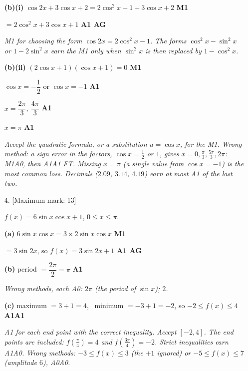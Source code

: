 \documentclass[12pt, twoside]{article}
\begin{document}
\begin{enumerate}[itemsep=0.1cm]
\textbf{(b)(i)} $\cos 2x + 3\cos x + 2 = 2\cos^{2}x - 1 + 3\cos x + 2$
\hfill \textbf{M1}

$= 2\cos^{2}x + 3\cos x + 1$ \hfill \textbf{A1 AG}

\emph{M1 for choosing the form $\cos 2x = 2\cos^{2}x - 1$. The forms
$\cos^{2}x - \sin^{2}x$ or $1 - 2\sin^{2}x$ earn the M1 only when
$\sin^{2}x$ is then replaced by $1 - \cos^{2}x$.}

\textbf{(b)(ii)} $(2\cos x + 1)(\cos x + 1) = 0$ \hfill \textbf{M1}

$\cos x = -\dfrac{1}{2}$ \quad or \quad $\cos x = -1$ \hfill \textbf{A1}

$x = \dfrac{2\pi}{3},\ \dfrac{4\pi}{3}$ \hfill \textbf{A1}

$x = \pi$ \hfill \textbf{A1}

\emph{Accept the quadratic formula, or a substitution $u = \cos x$, for
the M1. Wrong method: a sign error in the factors, $\cos x = \frac{1}{2}$
or $1$, gives $x = 0, \frac{\pi}{3}, \frac{5\pi}{3}, 2\pi$: M1A0, then
A1A1 FT. Missing $x = \pi$ (a single value from $\cos x = -1$) is the
most common loss. Decimals ($2.09$, $3.14$, $4.19$) earn at most A1 of the
last two.}

\newpage

\item[4.] [Maximum mark: 13]

$f(x) = 6\sin x\cos x + 1$, \quad $0 \le x \le \pi$.

\textbf{(a)} $6\sin x\cos x = 3 \times 2\sin x\cos x$ \hfill \textbf{M1}

$= 3\sin 2x$, so $f(x) = 3\sin 2x + 1$ \hfill \textbf{A1 AG}

\textbf{(b)} period $= \dfrac{2\pi}{2} = \pi$ \hfill \textbf{A1}

\emph{Wrong methods, each A0: $2\pi$ (the period of $\sin x$); $2$.}

\textbf{(c)} maximum $= 3 + 1 = 4$, \ minimum $= -3 + 1 = -2$, so
$-2 \le f(x) \le 4$ \hfill \textbf{A1A1}

\emph{A1 for each end point with the correct inequality. Accept $[-2, 4]$.
The end points are included: $f\left(\frac{\pi}{4}\right) = 4$ and
$f\left(\frac{3\pi}{4}\right) = -2$. Strict inequalities earn A1A0. Wrong
methods: $-3 \le f(x) \le 3$ (the $+1$ ignored) or $-5 \le f(x) \le 7$
(amplitude $6$), A0A0.}


\end{enumerate}
\end{document}

